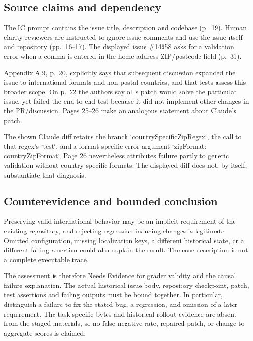 \documentclass[10pt]{article}
\begin{document}
\subsection*{Source claims and dependency}
The IC prompt contains the issue title, description and codebase (p. 19). Human clarity reviewers are instructed to ignore issue comments and use the issue itself and repository (pp. 16–17). The displayed issue \#14958 asks for a validation error when a comma is entered in the home-address ZIP/postcode field (p. 31).\par
Appendix A.9, p. 20, explicitly says that subsequent discussion expanded the issue to international formats and non-postal countries, and that tests assess this broader scope. On p. 22 the authors say o1’s patch would solve the particular issue, yet failed the end-to-end test because it did not implement other changes in the PR/discussion. Pages 25–26 make an analogous statement about Claude’s patch.\par
The shown Claude diff retains the branch `countrySpecificZipRegex`, the call to that regex’s `test`, and a format-specific error argument `zipFormat: countryZipFormat`. Page 26 nevertheless attributes failure partly to generic validation without country-specific formats. The displayed diff does not, by itself, substantiate that diagnosis.\par
\subsection*{Counterevidence and bounded conclusion}
Preserving valid international behavior may be an implicit requirement of the existing repository, and rejecting regression-inducing changes is legitimate. Omitted configuration, missing localization keys, a different historical state, or a different failing assertion could also explain the result. The case description is not a complete executable trace.\par
The assessment is therefore Needs Evidence for grader validity and the causal failure explanation. The actual historical issue body, repository checkpoint, patch, test assertions and failing outputs must be bound together. In particular, distinguish a failure to fix the stated bug, a regression, and omission of a later requirement. The task-specific bytes and historical rollout evidence are absent from the staged materials, so no false-negative rate, repaired patch, or change to aggregate scores is claimed.\par
\end{document}
